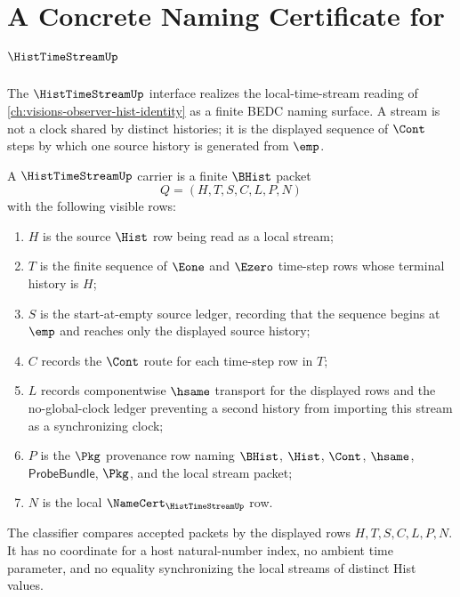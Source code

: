 \chapter{A Concrete Naming Certificate for $\HistTimeStreamUp$}
\label{ch:concrete-instances-histtimestream-namecert}

The $\HistTimeStreamUp$ interface realizes the local-time-stream reading of
\autoref{ch:visions-observer-hist-identity} as a finite BEDC naming surface. A
stream is not a clock shared by distinct histories; it is the displayed sequence
of $\Cont$ steps by which one source history is generated from $\emp$.

\begin{definition}
\label{def:histtimestream-namecert-carrier}
A $\HistTimeStreamUp$ carrier is a finite $\BHist$ packet
$$
Q=(H,T,S,C,L,P,N)
$$
with the following visible rows:
\begin{enumerate}
\item $H$ is the source $\Hist$ row being read as a local stream;
\item $T$ is the finite sequence of $\Eone$ and $\Ezero$ time-step rows whose
terminal history is $H$;
\item $S$ is the start-at-empty source ledger, recording that the sequence begins
at $\emp$ and reaches only the displayed source history;
\item $C$ records the $\Cont$ route for each time-step row in $T$;
\item $L$ records componentwise $\hsame$ transport for the displayed rows and
the no-global-clock ledger preventing a second history from importing this
stream as a synchronizing clock;
\item $P$ is the $\Pkg$ provenance row naming $\BHist$, $\Hist$, $\Cont$,
$\hsame$, $\mathsf{ProbeBundle}$, $\Pkg$, and the local stream packet;
\item $N$ is the local $\NameCert_{\HistTimeStreamUp}$ row.
\end{enumerate}
The classifier compares accepted packets by the displayed rows
$H,T,S,C,L,P,N$. It has no coordinate for a host natural-number index, no
ambient time parameter, and no equality synchronizing the local streams of
distinct Hist values.
\end{definition}

